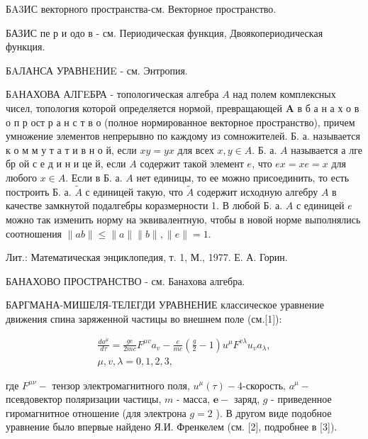 \documentclass[10pt]{article}
\begin{document}
БA3ИС векторного пространства-см. Векторное пространство.



БАЗИС пе р и одо в - см. Периодическая функция, Двоякопериодическая функция.



БAЛАНСА УРАВНEHИE - см. Энтропия.



БAНАХОВА АЛГEБРА - топологическая алгебра $A$ над полем комплексных чисел, топология которой определяется нормой, превращающей $\boldsymbol{A}$ в б а н а х о в о п р ост р а н с т в о (полное нормированное векторное пространство), причем умножение элементов непрерывно по каждому из сомножителей. Б. а. называется к о м м у т а т и в н о й, если $x y=y x$ для всех $x, y \in A$. Б. а. $A$ называется а лге бр ой с е д и н и це й, если $A$ содержит такой элемент $e$, что $e x=x e=x$ для любого $x \in A$. Если в Б. а. $A$ нет единицы, то ее можно присоединить, то есть построить Б. а. $\tilde{A}$ с единицей такую, что $\tilde{A}$ содержит исходную алгебру $A$ в качестве замкнутой подалгебры коразмерности 1. В любой Б. а. $A$ с единицей $e$ можно так изменить норму на эквивалентную, чтобы в новой норме выполнялись соотношения $\|a b\| \leqslant\|a\|\|b\|,\|e\|=1$.



Лит.: Математическая энциклопедия, т. 1, М., 1977. Е. А. Горин.



БАНАХОВО ПРОСТРАНСТВО - см. Банахова алгебра.



БАРГМАНА-МИШЕЛЯ-ТЕЛЕГДИ УРАВНЕНИЕ классическое уравнение движения спина заряженной частицы во внешнем поле (см.[1]):



\[

\begin{gathered}

\frac{d a^{\mu}}{d \tau}=\frac{g e}{2 m c} F^{\mu v} a_{v}-\frac{e}{m c}\left(\frac{g}{2}-1\right) u^{\mu} F^{v \lambda} u_{v} a_{\lambda}, \\

\mu, v, \lambda=0,1,2,3,

\end{gathered}

\]



где $F^{\mu \nu}-$ тензор электромагнитного поля, $u^{\mu}(\tau)-4$-скорость, $a^{\mu}-$ псевдовектор поляризации частицы, $m$ - масса, $\boldsymbol{e}-$ заряд, $g$ - приведенное гиромагнитное отношение (для электрона $g=2$ ). В другом виде подобное уравнение было впервые найдено Я.И. Френкелем (см. [2], подробнее в [3]).
\end{document}
